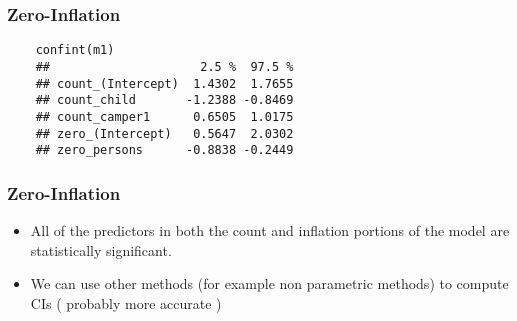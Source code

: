 \documentclass[MASTER.tex]{subfiles}
\begin{document}

\begin{frame}[fragile]
\frametitle{Zero-Inflation}
	\large
	\begin{verbatim}
	confint(m1)
	##                     2.5 %  97.5 %
	## count_(Intercept)  1.4302  1.7655
	## count_child       -1.2388 -0.8469
	## count_camper1      0.6505  1.0175
	## zero_(Intercept)   0.5647  2.0302
	## zero_persons      -0.8838 -0.2449
	\end{verbatim}
\end{frame}
\begin{frame}[fragile]
\frametitle{Zero-Inflation}
\Large
	\begin{itemize}
		\item	All of the predictors in both the count and inflation portions of the model are statistically significant. 
		\item We can use other methods  (for example non parametric methods) to compute CIs ( probably more accurate )
	\end{itemize}
\end{frame}

%	
%	
\end{document}
